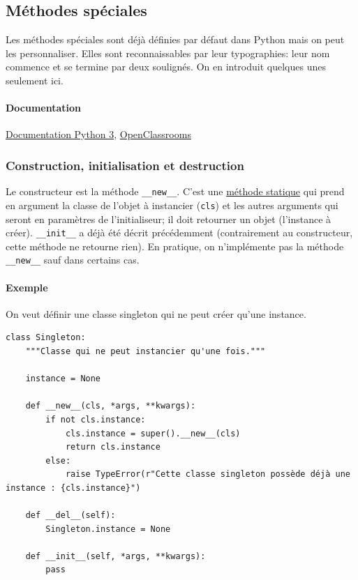 \documentclass[a4paper, 10pt]{article}
\begin{document}
\subsection{Méthodes spéciales}
 Les méthodes spéciales sont déjà définies par défaut dans Python mais on peut les personnaliser. Elles sont reconnaissables par leur typographies: leur nom commence et se termine par deux soulignés. On en introduit quelques unes seulement ici.

\paragraph{Documentation} \href{https://docs.python.org/3/reference/datamodel.html#specialnames}{Documentation Python 3}, \href{https://openclassrooms.com/courses/apprenez-a-programmer-en-python/les-methodes-speciales-1}{OpenClassrooms}


\subsubsection{Construction, initialisation et destruction}
Le constructeur est la méthode \texttt{__new__}. C'est une \hyperref[sec:staticmethod]{méthode statique} qui prend en argument la classe de l'objet à instancier (\texttt{cls}) et les autres arguments qui seront en paramètres de l'initialiseur; il doit retourner un objet (l'instance à créer). \texttt{__init__} a déjà été décrit précédemment (contrairement au constructeur, cette méthode ne retourne rien). En pratique, on n'implémente pas la méthode \texttt{__new__} sauf dans certains cas.

\paragraph{Exemple} On veut définir une classe \og singleton \fg{} qui ne peut créer qu'une instance.

\begin{verbatim}
class Singleton:
    """Classe qui ne peut instancier qu'une fois."""

    instance = None

    def __new__(cls, *args, **kwargs):
        if not cls.instance:
            cls.instance = super().__new__(cls)
            return cls.instance
        else:
            raise TypeError(r"Cette classe singleton possède déjà une instance : {cls.instance}")

    def __del__(self):
        Singleton.instance = None

    def __init__(self, *args, **kwargs):
        pass
\end{verbatim}
\end{document}
